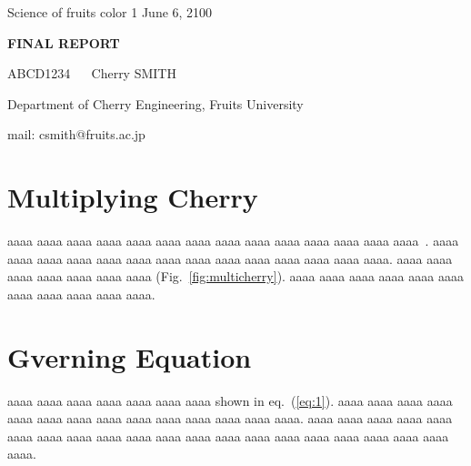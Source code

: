 \documentclass[dvipdfmx,a4j,11pt]{article}
\begin{document}
%
%
%
\noindent
\begin{flushleft} 
\large
Science of fruits color 1    %
\hspace{\fill}
June 6, 2100    %

\end{flushleft}
\begin{center} 
\LARGE 
\bf
{\Huge F}INAL {\Huge R}EPORT 

\vspace{0.3cm} 
\large \rm
ABCD1234 ~~    %
Cherry SMITH    %
    
Department of Cherry Engineering, Fruits University	%
    
mail: csmith@fruits.ac.jp	%

\end{center}
\normalsize
\vspace{0.5cm} 
%
%
%
\section{Multiplying Cherry}
%
%
% 
aaaa aaaa aaaa aaaa aaaa aaaa aaaa 
aaaa aaaa aaaa aaaa aaaa aaaa aaaa~\cite{orange}. 
aaaa aaaa aaaa aaaa aaaa aaaa aaaa 
aaaa aaaa aaaa aaaa aaaa aaaa aaaa. 
aaaa aaaa aaaa aaaa aaaa aaaa aaaa (Fig.~\ref{fig:multicherry}). 
aaaa aaaa aaaa aaaa aaaa aaaa aaaa 
aaaa aaaa aaaa aaaa.


%
%
%
\section{Gverning Equation}
%
%
% 
aaaa aaaa aaaa aaaa aaaa aaaa aaaa 
shown in eq.~(\ref{eq:1}).   
aaaa aaaa aaaa aaaa aaaa aaaa aaaa 
aaaa aaaa aaaa aaaa aaaa aaaa aaaa. 
aaaa aaaa aaaa aaaa aaaa aaaa aaaa 
aaaa aaaa aaaa aaaa aaaa aaaa aaaa 
aaaa aaaa aaaa aaaa aaaa aaaa aaaa. 
\end{document}

